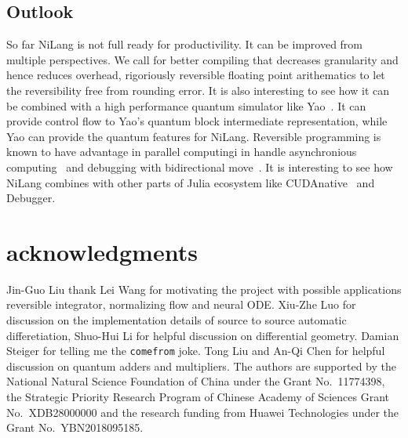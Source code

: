 \documentclass[aps,twocolumn,longbibliography,english,superscriptaddress,prr]{revtex4-1}
\newcommand{\<}{\langle}
\renewcommand{\>}{\rangle}
\newcommand{\blue}[1]{[{\bf  \color{blue}{JG: #1}}]}
\theoremstyle{definition}\newtheorem{definition}{\textit{Definition}}
\begin{document}
\subsection{Outlook}\label{sec:outlook}
So far NiLang is not full ready for productivility. It can be improved from multiple perspectives. We call for better compiling that decreases granularity and hence reduces overhead, rigoriously reversible floating point arithematics to let the reversibility free from rounding error. It is also interesting to see how it can be combined with a high performance quantum simulator like Yao~\cite{Luo2019}. It can provide control flow to Yao's quantum block intermediate representation, while Yao can provide the quantum features for NiLang.
Reversible programming is known to have advantage in parallel computingi in handle asynchronious computing~\cite{Jefferson1985} and debugging with bidirectional move~\cite{Boothe2000}.
It is interesting to see how NiLang combines with other parts of Julia ecosystem like CUDAnative~\cite{Besard2018} and Debugger.

\section{acknowledgments}
Jin-Guo Liu thank Lei Wang for motivating the project with possible applications reversible integrator, normalizing flow and neural ODE.
Xiu-Zhe Luo for discussion on the implementation details of source to source automatic differetiation,
Shuo-Hui Li for helpful discussion on differential geometry.
Damian Steiger for telling me the \texttt{comefrom} joke.
Tong Liu and An-Qi Chen for helpful discussion on quantum adders and multipliers.
The authors are supported by the National Natural Science Foundation of China under the Grant No.~11774398, the Strategic Priority Research Program of Chinese Academy of Sciences Grant No.~XDB28000000 and the research funding from Huawei Technologies under the Grant No.~YBN2018095185.




\pagebreak
\appendix
\end{document}
